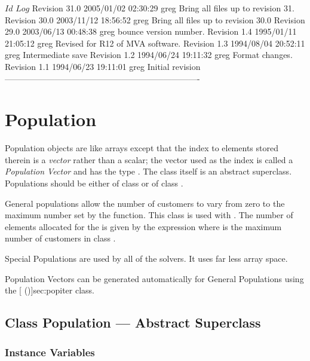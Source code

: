 \C 
\C $Id$
\C 
\C $Log$
\C Revision 31.0  2005/01/02 02:30:29  greg
\C Bring all files up to revision 31.
\C
\C Revision 30.0  2003/11/12 18:56:52  greg
\C Bring all files up to revision 30.0
\C
\C Revision 29.0  2003/06/13 00:48:38  greg
\C bounce version number.
\C
\C Revision 1.4  1995/01/11 21:05:12  greg
\C Revised for R12 of MVA software.
\C
\C Revision 1.3  1994/08/04  20:52:11  greg
\C Intermediate save
\C
\C Revision 1.2  1994/06/24  19:11:32  greg
\C Format changes.
\C
\C Revision 1.1  1994/06/23  19:11:01  greg
\C Initial revision
\C
\C ----------------------------------------------------------------------
\section{Population}
\label{sec:population}

Population objects are like arrays except that the index to elements
stored therein is a \emph{vector} rather than a scalar; the vector
used as the index is called a \emph{Population Vector} and has the
type .  The class  itself is an
abstract superclass.  Populations should be either of class
 or of class
.

General populations allow the number of customers to vary from zero to
the maximum number set by the
 function.  This
class is used with .  The number of
elements allocated for the  is
given by the expression  where  is the maximum number of customers
in class .

Special Populations are used by all of the  solvers.  It uses far less array space.

Population Vectors can be generated automatically for General
Populations using the [
(\Sec\Ref)]{sec:popiter} class.

\subsection{Class Population --- Abstract Superclass}
\subsubsection{Instance Variables}
\label{sec:population-ivars}

